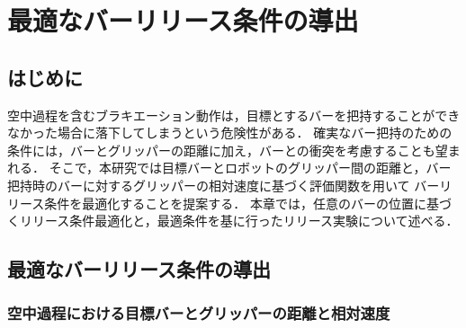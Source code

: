 \chapter[最適なバーリリース条件の導出]%
{最適なバーリリース条件の導出}
      \section{はじめに}

      空中過程を含むブラキエーション動作は，目標とするバーを把持することができなかった場合に落下してしまうという危険性がある．
      確実なバー把持のための条件には，バーとグリッパーの距離に加え，バーとの衝突を考慮することも望まれる．
      そこで，本研究では目標バーとロボットのグリッパー間の距離と，バー把持時のバーに対するグリッパーの相対速度に基づく評価関数を用いて
      バーリリース条件を最適化することを提案する．
      本章では，任意のバーの位置に基づくリリース条件最適化と，最適条件を基に行ったリリース実験について述べる．

      \section{最適なバーリリース条件の導出}
        \subsection{空中過程における目標バーとグリッパーの距離と相対速度}


